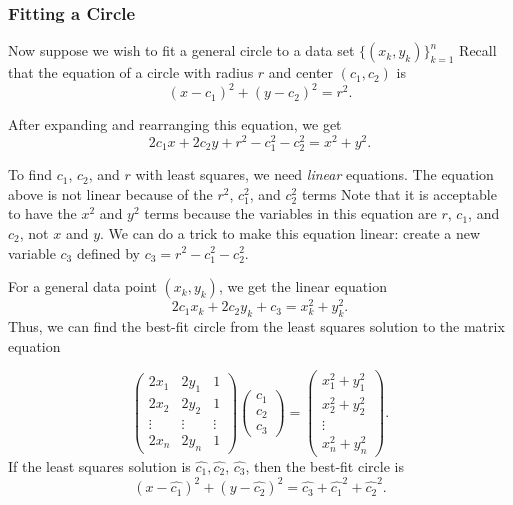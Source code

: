 
\subsubsection*{Fitting a Circle} %

Now suppose we wish to fit a general circle to a data set $\{(x_k, y_k)\}_{k=1}^n$
Recall that the equation of a circle with radius $r$ and center $(c_1,c_2)$ is
\begin{equation}
\label{circle}
(x-c_1)^2 + (y-c_2)^2 = r^2.
\end{equation}

After expanding and rearranging this equation, we get
\begin{equation*}
\label{circle2}
2c_1x + 2c_2y + r^2 - c_1^2 - c_2^2 = x^2 + y^2.
\end{equation*}

To find $c_1$, $c_2$, and $r$ with least squares, we need \emph{linear} equations.
The equation above is not linear because of the $r^2$, $c_1^2$, and $c_2^2$ terms
Note that it is acceptable to have the $x^2$ and $y^2$ terms because the variables in this equation are $r$, $c_1$, and $c_2$, not $x$ and $y$.
We can do a trick to make this equation linear: create a new variable $c_3$ defined by $c_3 = r^2-c_1^2-c_2^2$.

For a general data point $(x_k, y_k)$, we get the linear equation
\begin{equation*}
2c_1x_k+2c_2y_k+c_3=x_k^2+y_k^2.
\end{equation*}
Thus, we can find the best-fit circle from the least squares solution to the matrix equation

\begin{equation}\label{equ:circle_fit}
\begin{pmatrix}
2 x_1 & 2 y_1 & 1\\
2 x_2 & 2 y_2 & 1\\
\vdots & \vdots & \vdots \\
2 x_n & 2 y_n & 1
\end{pmatrix}
\begin{pmatrix}
c_1\\
c_2\\
c_3
\end{pmatrix}=
\begin{pmatrix}
x_1^2 + y_1^2\\
x_2^2 + y_2^2\\
\vdots\\
x_n^2 + y_n^2
\end{pmatrix}.
\end{equation}
If the least squares solution is $\widehat{c_1}, \widehat{c_2}$, $\widehat{c_3}$, then the best-fit circle is
\[
(x-\widehat{c_1})^2 + (y-\widehat{c_2})^2 = \widehat{c_3}+\widehat{c_1}^2+\widehat{c_2}^2.
\]

